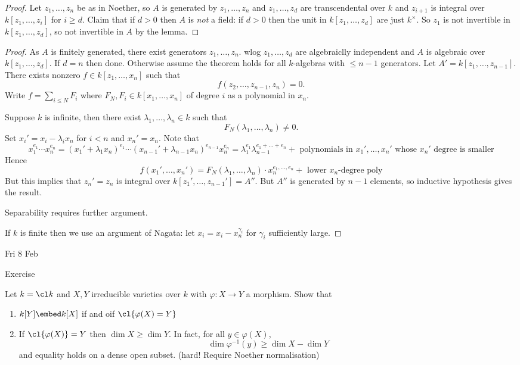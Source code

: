 \documentclass[a4paper]{article}
\begin{document}
\begin{proof}
  Let \(z_1, \dots, z_n\) be as in Noether, so \(A\) is generated by \(z_1, \dots, z_n\) and \(z_1, \dots, z_d\) are transcendental over \(k\) and \(z_{i + 1}\) is integral over \(k[z_1, \dots, z_i]\) for \(i \geq d\). Claim that if \(d > 0\) then \(A\) is \emph{not} a field: if \(d > 0\) then the unit in \(k[z_1, \dots, z_d]\) are just \(k^\times\). So \(z_1\) is not invertible in \(k[z_1, \dots, z_d]\), so not invertible in \(A\) by the lemma.
\end{proof}

\begin{proof}
  As \(A\) is finitely generated, there exist generators \(z_1, \dots, z_n\). wlog \(z_1, \dots, z_d\) are algebraiclly independent and \(A\) is algebraic over \(k[z_1, \dots, z_d]\). If \(d = n\) then done. Otherwise assume the theorem holds for all \(k\)-algebras with \(\leq n - 1\) generators. Let \(A' = k[z_1, \dots, z_{n - 1}]\). There exists nonzero \(f \in k[z_1, \dots, x_n]\) such that
  \[
    f(z_2, \dots, z_{n - 1}, z_n) = 0.
  \]
  Write \(f = \sum_{i \leq N} F_i\) where \(F_N, F_i \in k[x_1, \dots, x_n]\) of degree \(i\) as a polynomial in \(x_n\).

  Suppose \(k\) is infinite, then there exist \(\lambda_1, \dots, \lambda_n \in k\) such that
  \[
    F_N(\lambda_1, \dots, \lambda_n) \neq 0.
  \]
  Set \(x_i' = x_i - \lambda_i x_n\) for \(i < n\) and \(x_n' = x_n\). Note that
  \[
    x_1^{e_1} \cdots x_n^{e_n}
    = (x_1' + \lambda_1 x_n)^{e_1} \cdots (x_{n - 1}' + \lambda_{n - 1} x_n)^{e_{n - 1}} x_n^{e_n}
    = \lambda_1^{e_1} \lambda_{n - 1}^{e_1 + \dots + e_n} + \text{ polynomials in \(x_1', \dots, x_n'\) whose \(x_n'\) degree is smaller}
  \]
  Hence
  \[
    f(x_1', \dots, x_n') = F_N(\lambda_1, \dots, \lambda_n) \cdot x_n^{e_1, \dots, e_n} + \text{ lower \(x_n\)-degree poly}
  \]
  But this implies that \(z_n' = z_n\) is integral over \(k[z_1', \dots, z_{n - 1}'] = A''\). But \(A''\) is generated by \(n - 1\) elements, so inductive hypothesis gives the result.

  Separability requires further argument.

  If \(k\) is finite then we use an argument of Nagata: let \(x_i = x_i - x_n^{\gamma_i}\) for \(\gamma_i\) sufficiently large.
\end{proof}

Fri 8 Feb

Exercise

Let \(k = \cl k\)  and \(X, Y\) irreducible varieties over \(k\) with \(\varphi: X \to Y\) a morphism. Show that
\begin{enumerate}
\item \(k[Y] \embed k[X]\) if and oif \(\cl{\varphi(X) = Y}\) 
\item If \(\cl{\varphi(X)} = Y\) then \(\dim X \geq \dim Y\). In fact, for all \(y \in \varphi(X)\),
  \[
    \dim \varphi^{-1}(y) \geq \dim X - \dim Y
  \]
  and equality holds on a dense open subset. (hard! Require Noether normalisation)
\end{enumerate}
\end{document}
